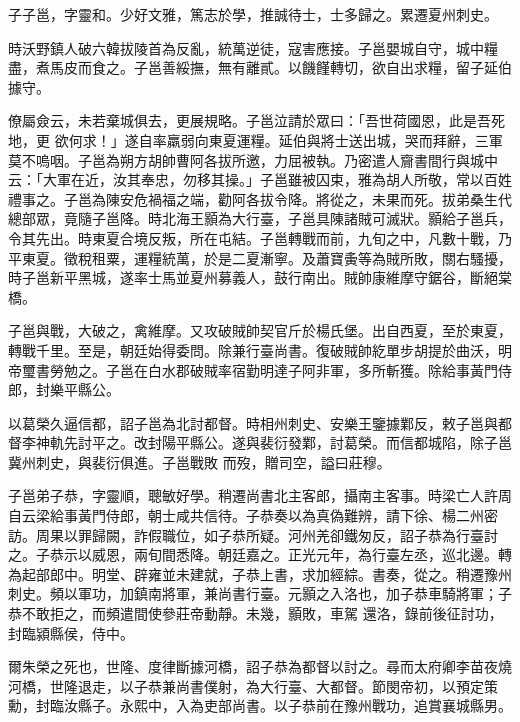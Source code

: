 \begin{pinyinscope}
 子子邕，字靈和。少好文雅，篤志於學，推誠待士，士多歸之。累遷夏州刺史。



 時沃野鎮人破六韓拔陵首為反亂，統萬逆徒，寇害應接。子邕嬰城自守，城中糧盡，煮馬皮而食之。子邕善綏撫，無有離貳。以饑饉轉切，欲自出求糧，留子延伯據守。



 僚屬僉云，未若棄城俱去，更展規略。子邕泣請於眾曰：「吾世荷國恩，此是吾死地，更
 欲何求！」遂自率羸弱向東夏運糧。延伯與將士送出城，哭而拜辭，三軍莫不嗚咽。子邕為朔方胡帥曹阿各拔所邀，力屈被執。乃密遣人齎書間行與城中云：「大軍在近，汝其奉忠，勿移其操。」子邕雖被囚束，雅為胡人所敬，常以百姓禮事之。子邕為陳安危禍福之端，勸阿各拔令降。將從之，未果而死。拔弟桑生代總部眾，竟隨子邕降。時北海王顥為大行臺，子邕具陳諸賊可滅狀。顥給子邕兵，令其先出。時東夏合境反叛，所在屯結。子邕轉戰而前，九旬之中，凡數十戰，乃平東夏。徵稅租粟，運糧統萬，於是二夏漸寧。及蕭寶夤等為賊所敗，關右騷擾，
 時子邕新平黑城，遂率士馬並夏州募義人，鼓行南出。賊帥康維摩守鋸谷，斷絕棠橋。



 子邕與戰，大破之，禽維摩。又攻破賊帥契官斤於楊氏堡。出自西夏，至於東夏，轉戰千里。至是，朝廷始得委問。除兼行臺尚書。復破賊帥紇單步胡提於曲沃，明帝璽書勞勉之。子邕在白水郡破賊率宿勤明達子阿非軍，多所斬獲。除給事黃門侍郎，封樂平縣公。



 以葛榮久逼信都，詔子邕為北討都督。時相州刺史、安樂王鑒據鄴反，敕子邕與都督李神軌先討平之。改封陽平縣公。遂與裴衍發鄴，討葛榮。而信都城陷，除子邕冀州刺史，與裴衍俱進。子邕戰敗
 而歿，贈司空，謚曰莊穆。



 子邕弟子恭，字靈順，聰敏好學。稍遷尚書北主客郎，攝南主客事。時梁亡人許周自云梁給事黃門侍郎，朝士咸共信待。子恭奏以為真偽難辨，請下徐、楊二州密訪。周果以罪歸闕，詐假職位，如子恭所疑。河州羌卻鐵匆反，詔子恭為行臺討之。子恭示以威恩，兩旬間悉降。朝廷嘉之。正光元年，為行臺左丞，巡北邊。轉為起部郎中。明堂、辟雍並未建就，子恭上書，求加經綜。書奏，從之。稍遷豫州刺史。頻以軍功，加鎮南將軍，兼尚書行臺。元顥之入洛也，加子恭車騎將軍；子恭不敢拒之，而頻遣間使參莊帝動靜。未幾，顥敗，車駕
 還洛，錄前後征討功，封臨潁縣侯，侍中。



 爾朱榮之死也，世隆、度律斷據河橋，詔子恭為都督以討之。尋而太府卿李苗夜燒河橋，世隆退走，以子恭兼尚書僕射，為大行臺、大都督。節閔帝初，以預定策勳，封臨汝縣子。永熙中，入為吏部尚書。以子恭前在豫州戰功，追賞襄城縣男。




\end{pinyinscope}
